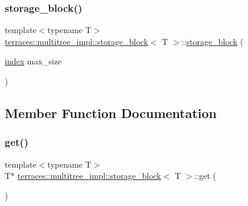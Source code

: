 \subsubsection{\texorpdfstring{storage\+\_\+block()}{storage\_block()}}
{\footnotesize\ttfamily template$<$typename T$>$ \\
\hyperlink{classterraces_1_1multitree__impl_1_1storage__block}{terraces\+::multitree\+\_\+impl\+::storage\+\_\+block}$<$ T $>$\+::\hyperlink{classterraces_1_1multitree__impl_1_1storage__block}{storage\+\_\+block} (\begin{DoxyParamCaption}\item[{\hyperlink{namespaceterraces_adbc33ccb543d1634e96d0eb02e472c77}{index}}]{max\+\_\+size }\end{DoxyParamCaption})\hspace{0.3cm}{\ttfamily [inline]}}



\subsection{Member Function Documentation}
\mbox{\label{classterraces_1_1multitree__impl_1_1storage__block_aba7c0316e7d2f65bf2139666512c7abb}} 
\subsubsection{\texorpdfstring{get()}{get()}}
{\footnotesize\ttfamily template$<$typename T$>$ \\
T$\ast$ \hyperlink{classterraces_1_1multitree__impl_1_1storage__block}{terraces\+::multitree\+\_\+impl\+::storage\+\_\+block}$<$ T $>$\+::get (\begin{DoxyParamCaption}{ }\end{DoxyParamCaption})\hspace{0.3cm}{\ttfamily [inline]}}

\mbox{\label{classterraces_1_1multitree__impl_1_1storage__block_af7571da3ca9cb0eb53bdb0a04b42585f}} 
